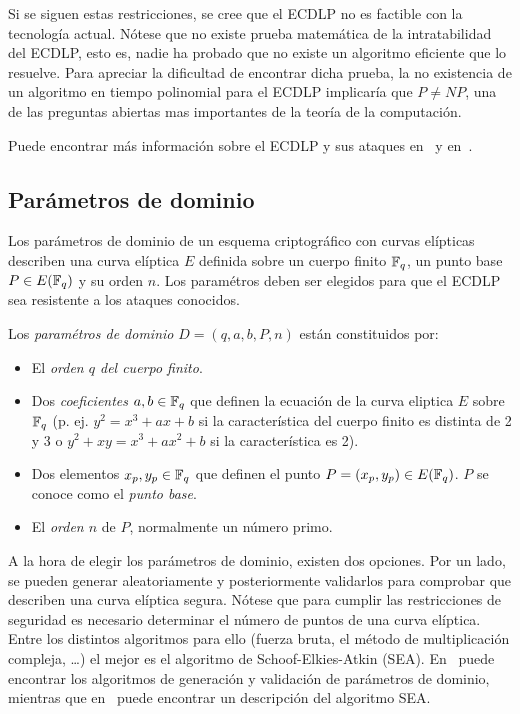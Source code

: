 Si se siguen estas restricciones, se cree que el ECDLP no es factible con la tecnología actual. Nótese que no existe prueba matemática de la intratabilidad del ECDLP, esto es, nadie ha probado que no existe un algoritmo eficiente que lo resuelve. Para apreciar la dificultad de encontrar dicha prueba, la no existencia de un algoritmo en tiempo polinomial para el ECDLP implicaría que $P \neq NP$, una de las preguntas abiertas mas importantes de la teoría de la computación.

Puede encontrar más información sobre el ECDLP y sus ataques en~\cite[cap. 4]{Hankerson:2003} y en~\cite[cap. 4]{Washington:2008}.

\subsection{Parámetros de dominio}
\label{sub:Parámetros de dominio}

Los parámetros de dominio de un esquema criptográfico con curvas elípticas describen una curva elíptica $E$ definida sobre un cuerpo finito $\mathbb{F}_q$, un punto base $P \in E(\mathbb{F}_q)$ y su orden $n$. Los paramétros deben ser elegidos para que el ECDLP sea resistente a los ataques conocidos.

\begin{definicion}
    Los \emph{paramétros de dominio} $D = (q, a, b, P, n)$ están constituidos por:
    \begin{itemize}
        \item El \emph{orden $q$ del cuerpo finito}.
        \item Dos \emph{coeficientes} $a, b \in \mathbb{F}_q$ que definen la ecuación de la curva eliptica $E$ sobre $\mathbb{F}_q$ (p. ej. $y^2 = x^3 + a x + b$ si la característica del cuerpo finito es distinta de 2 y 3 o $y^2 + x y = x^3 + a x^2 + b$ si la característica es 2).
        \item Dos elementos $x_p, y_p \in \mathbb{F}_q$ que definen el punto $P = (x_p, y_p) \in E(\mathbb{F}_q)$. $P$ se conoce como el \emph{punto base}.
        \item El \emph{orden $n$} de $P$, normalmente un número primo.
    \end{itemize}
\end{definicion}

A la hora de elegir los parámetros de dominio, existen dos opciones. Por un lado, se pueden generar aleatoriamente y posteriormente validarlos para comprobar que describen una curva elíptica segura. Nótese que para cumplir las restricciones de seguridad es necesario determinar el número de puntos de una curva elíptica. Entre los distintos algoritmos para ello (fuerza bruta, el método de multiplicación compleja, \ldots) el mejor es el algoritmo de Schoof-Elkies-Atkin (SEA). En~\cite[cap. 4]{Hankerson:2003} puede encontrar los algoritmos de generación y validación de parámetros de dominio, mientras que en~\cite[cap. XI]{Silverman:2009} puede encontrar un descripción del algoritmo SEA.

